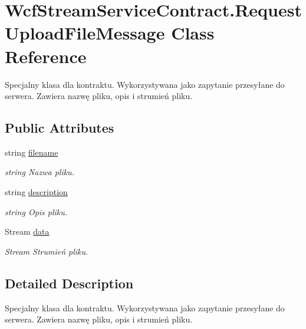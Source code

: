 \hypertarget{class_wcf_stream_service_contract_1_1_request_upload_file_message}{}\section{Wcf\+Stream\+Service\+Contract.\+Request\+Upload\+File\+Message Class Reference}
\label{class_wcf_stream_service_contract_1_1_request_upload_file_message}


Specjalny klasa dla kontraktu. Wykorzystywana jako zapytanie przesyłane do serwera. Zawiera nazwę pliku, opis i strumień pliku.  


\subsection*{Public Attributes}
\begin{DoxyCompactItemize}
\item 
string \hyperlink{class_wcf_stream_service_contract_1_1_request_upload_file_message_a2c52193f85cbb0989b7b237a33f81612}{filename}
\begin{DoxyCompactList}\small\item\em string Nazwa pliku. \end{DoxyCompactList}\item 
string \hyperlink{class_wcf_stream_service_contract_1_1_request_upload_file_message_a2ae3b446f6d0fc13f7bc8509df48da04}{description}
\begin{DoxyCompactList}\small\item\em string Opis pliku. \end{DoxyCompactList}\item 
Stream \hyperlink{class_wcf_stream_service_contract_1_1_request_upload_file_message_a1d15ea0a19576412292dc93d042368c2}{data}
\begin{DoxyCompactList}\small\item\em Stream Strumień pliku. \end{DoxyCompactList}\end{DoxyCompactItemize}


\subsection{Detailed Description}
Specjalny klasa dla kontraktu. Wykorzystywana jako zapytanie przesyłane do serwera. Zawiera nazwę pliku, opis i strumień pliku. 




